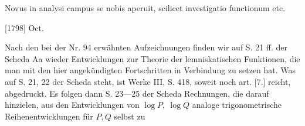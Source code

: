 \indent Novus in analysi campus se nobis aperuit, scilicet investigatio functionum etc.
\par\noindent\hfill[1798] Oct.

\medskip\begingroup\small
\indent Nach den bei der Nr. 94 erwähnten Aufzeichnungen finden wir auf S. 21 ff. der Scheda Aa wieder Entwicklungen zur Theorie der lemniskatischen Funktionen, die man mit den hier angekündigten Fortschritten in Verbindung zu setzen hat. Was auf S. 21, 22 der Scheda steht, ist Werke III, S. 418, soweit noch art. [7.] reicht, abgedruckt. Es folgen dann S. 23—25 der Scheda Rechnungen, die darauf hinzielen, aus den Entwicklungen von \(\log P,\ \log Q\) analoge trigonometrische Reihenentwicklungen für \(P,Q\) selbst zu
\par\endgroup

